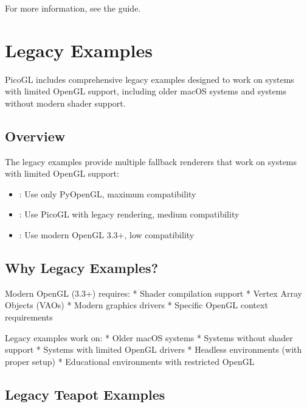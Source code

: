\documentclass[a4paper,10pt,english,openany,oneside]{sphinxmanual}
\begin{document}
\sphinxAtStartPar
For more information, see the {\hyperref[\detokenize{contributing::doc}]{}} guide.

\sphinxstepscope


\section{Legacy Examples}
\label{\detokenize{legacy_examples:legacy-examples}}\label{\detokenize{legacy_examples::doc}}
\sphinxAtStartPar
PicoGL includes comprehensive legacy examples designed to work on systems with limited OpenGL support, including older macOS systems and systems without modern shader support.


\subsection{Overview}
\label{\detokenize{legacy_examples:overview}}
\sphinxAtStartPar
The legacy examples provide multiple fallback renderers that work on systems with limited OpenGL support:
\begin{itemize}
\item {} 
\sphinxAtStartPar
{}: Use only PyOpenGL, maximum compatibility

\item {} 
\sphinxAtStartPar
{}: Use PicoGL with legacy rendering, medium compatibility

\item {} 
\sphinxAtStartPar
{}: Use modern OpenGL 3.3+, low compatibility

\end{itemize}


\subsection{Why Legacy Examples?}
\label{\detokenize{legacy_examples:why-legacy-examples}}
\sphinxAtStartPar
Modern OpenGL (3.3+) requires:
* Shader compilation support
* Vertex Array Objects (VAOs)
* Modern graphics drivers
* Specific OpenGL context requirements

\sphinxAtStartPar
Legacy examples work on:
* Older macOS systems
* Systems without shader support
* Systems with limited OpenGL drivers
* Headless environments (with proper setup)
* Educational environments with restricted OpenGL


\subsection{Legacy Teapot Examples}
\label{\detokenize{legacy_examples:legacy-teapot-examples}}
\end{document}
